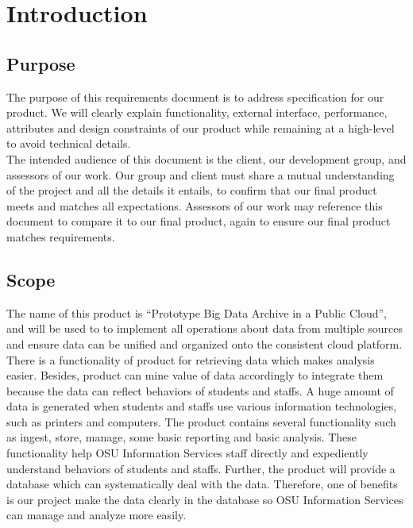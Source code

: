 \documentclass[letterpaper,10pt]{article}
\begin{document}
    \tableofcontents

    \newpage
    \section{Introduction}
        \subsection{Purpose}
        The purpose of this requirements document is to address specification for our product. We will clearly explain functionality, external interface, performance, attributes and design constraints of our product while remaining at a high-level to avoid technical details.\\ 
        
        \noindent The intended audience of this document is the client, our development group, and assessors of our work. Our group and client must share a mutual understanding of the project and all the details it entails, to confirm that our final product meets and matches all expectations. Assessors of our work may reference this document to compare it to our final product, again to ensure our final product matches requirements.
        
        \subsection{Scope}
        The name of this product is “Prototype Big Data Archive in a Public Cloud”, and will be used to to implement all operations about data from multiple sources and ensure data can be unified and organized onto the consistent cloud platform. There is a functionality of  product for retrieving data which makes analysis easier. Besides, product can mine value of data accordingly to integrate them because the data can reflect behaviors of students and staffs. 
        \noindent A huge amount of data is generated when students and staffs use various information technologies, such as printers and computers. The product contains several functionality such as ingest, store, manage, some basic reporting and basic analysis. These functionality help OSU Information Services staff directly and expediently understand behaviors of students and staffs. Further, the product will provide a database which can systematically deal with the data.  Therefore, one of benefits is our project make the data clearly in the database so OSU Information Services can manage and analyze more easily.
\end{document}
